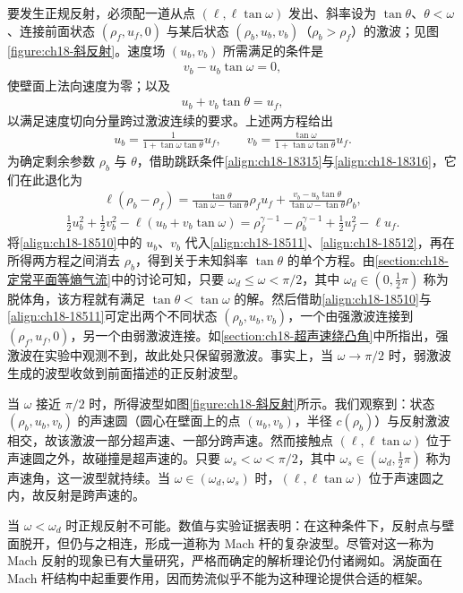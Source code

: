 \documentclass[../../main.tex]{subfiles}
\begin{document}
要发生正规反射，必须配一道从点 $(\ell,\ell\tan\omega)$ 发出、斜率设为 $\tan\theta$、$\theta<\omega$、连接前面状态 $(\rho_f,u_f,0)$ 与某后状态 $(\rho_b,u_b,v_b)$（$\rho_b>\rho_f$）的激波；见图\cref{figure:ch18-斜反射}。速度场 $(u_b,v_b)$ 所需满足的条件是
\begin{align}
v_b-u_b\tan\omega=0,
\label{align:ch18-1858}
\end{align}
使壁面上法向速度为零；以及
\begin{align}
u_b+v_b\tan\theta=u_f,
\label{align:ch18-1859}
\end{align}
以满足速度切向分量跨过激波连续的要求。上述两方程给出
\begin{align}
u_b=\frac{1}{1+\tan\omega\tan\theta}u_f,\qquad
v_b=\frac{\tan\omega}{1+\tan\omega\tan\theta}u_f.
\label{align:ch18-18510}
\end{align}
为确定剩余参数 $\rho_b$ 与 $\theta$，借助跳跃条件\eqref{align:ch18-18315}与\eqref{align:ch18-18316}，它们在此退化为
\begin{align}
\ell(\rho_b-\rho_f)=\frac{\tan\theta}{\tan\omega-\tan\theta}\rho_fu_f
+\frac{v_b-u_b\tan\theta}{\tan\omega-\tan\theta}\rho_b,
\label{align:ch18-18511}
\end{align}
\begin{align}
\frac12 u_b^2+\frac12 v_b^2-\ell(u_b+v_b\tan\omega)
=\rho_f^{\gamma-1}-\rho_b^{\gamma-1}+\frac12 u_f^2-\ell u_f.
\label{align:ch18-18512}
\end{align}
将\eqref{align:ch18-18510}中的 $u_b$、$v_b$ 代入\eqref{align:ch18-18511}、\eqref{align:ch18-18512}，再在所得两方程之间消去 $\rho_b$，得到关于未知斜率 $\tan\theta$ 的单个方程。由\cref{section:ch18-定常平面等熵气流}中的讨论可知，只要 $\omega_d\leqslant\omega<\pi/2$，其中 $\omega_d\in(0,\frac12\pi)$ 称为脱体角，该方程就有满足 $\tan\theta<\tan\omega$ 的解。然后借助\eqref{align:ch18-18510}与\eqref{align:ch18-18511}可定出两个不同状态 $(\rho_b,u_b,v_b)$，一个由强激波连接到 $(\rho_f,u_f,0)$，另一个由弱激波连接。如\cref{section:ch18-超声速绕凸角}中所指出，强激波在实验中观测不到，故此处只保留弱激波。事实上，当 $\omega\to\pi/2$ 时，弱激波生成的波型收敛到前面描述的正反射波型。

当 $\omega$ 接近 $\pi/2$ 时，所得波型如图\cref{figure:ch18-斜反射}所示。我们观察到：状态 $(\rho_b,u_b,v_b)$ 的声速圆（圆心在壁面上的点 $(u_b,v_b)$，半径 $c(\rho_b)$）与反射激波相交，故该激波一部分超声速、一部分跨声速。然而接触点 $(\ell,\ell\tan\omega)$ 位于声速圆之外，故碰撞是超声速的。只要 $\omega_s<\omega<\pi/2$，其中 $\omega_s\in(\omega_d,\frac12\pi)$ 称为声速角，这一波型就持续。当 $\omega\in(\omega_d,\omega_s)$ 时，$(\ell,\ell\tan\omega)$ 位于声速圆之内，故反射是跨声速的。

当 $\omega<\omega_d$ 时正规反射不可能。数值与实验证据表明：在这种条件下，反射点与壁面脱开，但仍与之相连，形成一道称为 Mach 杆的复杂波型。尽管对这一称为 Mach 反射的现象已有大量研究，严格而确定的解析理论仍付诸阙如。涡旋面在 Mach 杆结构中起重要作用，因而势流似乎不能为这种理论提供合适的框架。
\end{document}
